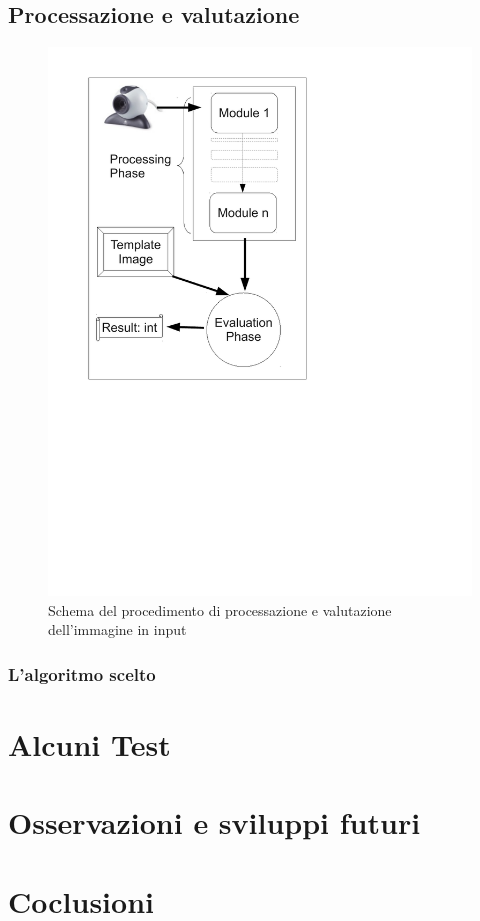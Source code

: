 \documentclass[a4paper,10pt, twocolumn]{article}
\begin{document}
 \subsection{Processazione e valutazione}
  \begin{figure}[t]
    \centering
    \includegraphics[scale=0.3]{recognitionEngineScheme.pdf}
    \caption{Schema del procedimento di processazione e valutazione dell'immagine in input}
    \label{reScheme}
  \end{figure}
  
  \subsubsection{L'algoritmo scelto}

  
 
\section{Alcuni Test}

\section{Osservazioni e sviluppi futuri}

\section{Coclusioni}


\clearpage



\nocite{*}



\end{document}
